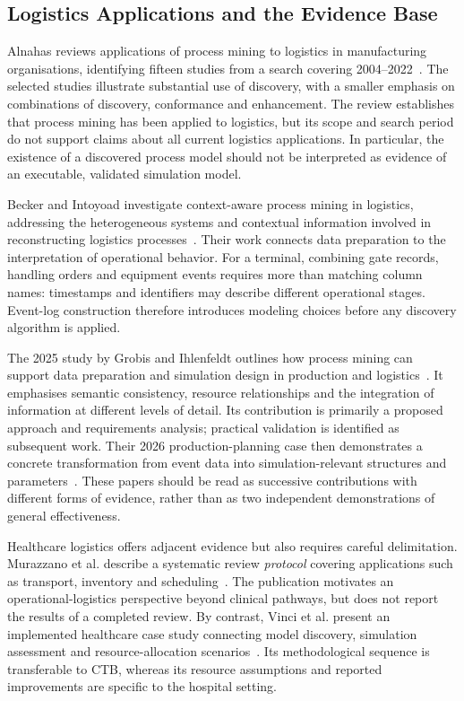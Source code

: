 \subsection{Logistics Applications and the Evidence Base}

Alnahas reviews applications of process mining to logistics in manufacturing organisations, identifying fifteen studies from a search covering 2004--2022~\cite{RWAlnahas2023Logistics}. The selected studies illustrate substantial use of discovery, with a smaller emphasis on combinations of discovery, conformance and enhancement. The review establishes that process mining has been applied to logistics, but its scope and search period do not support claims about all current logistics applications. In particular, the existence of a discovered process model should not be interpreted as evidence of an executable, validated simulation model.

Becker and Intoyoad investigate context-aware process mining in logistics, addressing the heterogeneous systems and contextual information involved in reconstructing logistics processes~\cite{RWBecker2017Context}. Their work connects data preparation to the interpretation of operational behavior. For a terminal, combining gate records, handling orders and equipment events requires more than matching column names: timestamps and identifiers may describe different operational stages. Event-log construction therefore introduces modeling choices before any discovery algorithm is applied.

The 2025 study by Grobis and Ihlenfeldt outlines how process mining can support data preparation and simulation design in production and logistics~\cite{Grobis2025ProductionLogistics}. It emphasises semantic consistency, resource relationships and the integration of information at different levels of detail. Its contribution is primarily a proposed approach and requirements analysis; practical validation is identified as subsequent work. Their 2026 production-planning case then demonstrates a concrete transformation from event data into simulation-relevant structures and parameters~\cite{Grobis2026SimulationDevelopment}. These papers should be read as successive contributions with different forms of evidence, rather than as two independent demonstrations of general effectiveness.

Healthcare logistics offers adjacent evidence but also requires careful delimitation. Murazzano et al. describe a systematic review \emph{protocol} covering applications such as transport, inventory and scheduling~\cite{RWMurazzano2026Protocol}. The publication motivates an operational-logistics perspective beyond clinical pathways, but does not report the results of a completed review. By contrast, Vinci et al. present an implemented healthcare case study connecting model discovery, simulation assessment and resource-allocation scenarios~\cite{Hospital2026Vinci}. Its methodological sequence is transferable to CTB, whereas its resource assumptions and reported improvements are specific to the hospital setting.

